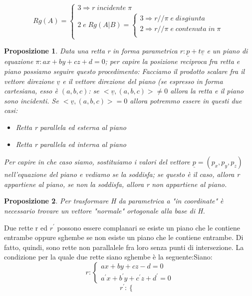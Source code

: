 \documentclass[12pt]{article}
\newenvironment{para}{\begin{adjustwidth}{13mm}{}}{\end{adjustwidth}}
\newtheorem{Proposizione}{Proposizione}[subsection]
\begin{document}
\begin{para}
$$Rg(A) = \begin{cases}
    3 \Rightarrow r \; incidente \; \pi \\
    2 \; e \; Rg(A|B) = \begin{cases}
        3 \Rightarrow r // \pi \; e \; disgiunta \\
        2 \Rightarrow r // \pi \; e \; contenuta \; in \; \pi \\
    \end{cases}
\end{cases}$$
\begin{Proposizione}
    Data una retta r in forma parametrica $r: \underline{p} + t\underline{v}$ e un piano di equazione $\pi: ax+by+cz+d = 0$; per capire la posizione reciproca fra retta e piano possiamo seguire questo procedimento: Facciamo il prodotto scalare fra il vettore direzione $\underline{v}$ e il vettore direzione del piano (se espresso in forma cartesiana, esso è $(a,b,c)$: se $<\underline{v}, (a,b,c)> \neq 0$ allora la retta e il piano sono incidenti. Se $<\underline{v}, (a,b,c)> = 0$ allora potremmo essere in questi due casi: \begin{itemize}
        \item Retta r parallela ed esterna al piano
        \item Retta r parallela ed interna al piano
    \end{itemize}
    Per capire in che caso siamo, sostituiamo i valori del vettore $\underline{p} = (p_x, p_y, p_z)$ nell'equazione del piano e vediamo se la soddisfa; se questo è il caso, allora r appartiene al piano, se non la soddisfa, allora r non appartiene al piano.
\end{Proposizione}
\begin{Proposizione}
    Per trasformare H da parametrica a "in coordinate" è necessario trovare un vettore "normale" ortogonale alla base di H.
\end{Proposizione}
Due rette r ed $r^{'}$ possono essere complanari se esiste un piano che le contiene entrambe oppure sghembe se non esiste un piano che le contiene entrambe. Di fatto, quindi, sono rette non parallalele fra loro senza punti di intersezione. La condizione per la quale due rette siano sghembe è la seguente:\newline Siano: $$r: \begin{cases}
    ax+by+cz-d = 0 \\
    a^{'}x+b^{'}y+c^{'}z+d^{'} = 0
\end{cases}$$
$$r^{'}:\begin{cases}

\end{cases}$$
\end{para}
\end{document}
